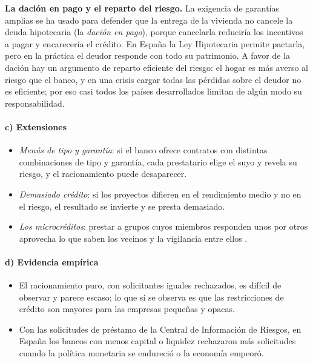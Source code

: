 \documentclass[11pt]{article}
\begin{document}
\begin{anotaciones}
\textbf{La dación en pago y el reparto del riesgo.} La exigencia de garantías amplias se ha usado para defender que la entrega de la vivienda no cancele la deuda hipotecaria (la \emph{dación en pago}), porque cancelarla reduciría los incentivos a pagar y encarecería el crédito. En España la Ley Hipotecaria permite pactarla, pero en la práctica el deudor responde con todo su patrimonio. A favor de la dación hay un argumento de reparto eficiente del riesgo: el hogar es más averso al riesgo que el banco, y en una crisis cargar todas las pérdidas sobre el deudor no es eficiente; por eso casi todos los países desarrollados limitan de algún modo su responsabilidad.
\end{anotaciones}

\paragraph{c) Extensiones}

\begin{itemize}
\item \emph{Menús de tipo y garantía}: si el banco ofrece contratos con distintas combinaciones de tipo y garantía, cada prestatario elige el suyo y revela su riesgo, y el racionamiento puede desaparecer\nocite{Bester1985Screening}.
\item \emph{Demasiado crédito}: si los proyectos difieren en el rendimiento medio y no en el riesgo, el resultado se invierte y se presta demasiado\nocite{DeMezaWebb1987Too}.
\item \emph{Los microcréditos}: prestar a grupos cuyos miembros responden unos por otros aprovecha lo que saben los vecinos y la vigilancia entre ellos\nocite{Stiglitz1990Peer,Ghatak1999Group} .
\end{itemize}

\paragraph{d) Evidencia empírica}

\begin{itemize}
\item El racionamiento puro, con solicitantes iguales rechazados, es difícil de observar y parece escaso; lo que sí se observa es que las restricciones de crédito son mayores para las empresas pequeñas y opacas\nocite{BergerUdell1992Some}.
\item Con las solicitudes de préstamo de la Central de Información de Riesgos, en España los bancos con menos capital o liquidez rechazaron más solicitudes cuando la política monetaria se endureció o la economía empeoró\nocite{JimenezEtAl2012Credit}.
\end{itemize}
\end{document}
